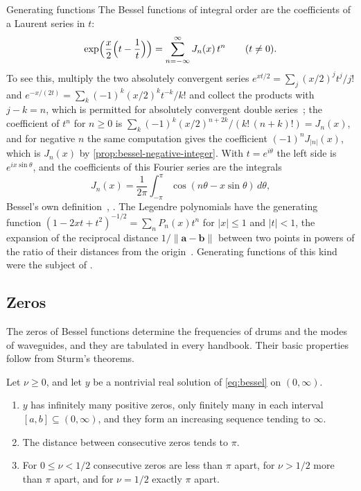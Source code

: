 \begin{note}{Generating functions}
The Bessel functions of integral order are the coefficients of a Laurent series in $t$:
\[
\exp\Bigl(\frac x2\Bigl(t-\frac1t\Bigr)\Bigr)=\sum_{n=-\infty}^\infty J_n(x)\,t^n\qquad(t\ne0).
\]
To see this, multiply the two absolutely convergent series $e^{xt/2}=\sum_j(x/2)^jt^j/j!$ and $e^{-x/(2t)}=\sum_k(-1)^k(x/2)^kt^{-k}/k!$ and collect the products with $j-k=n$, which is permitted for absolutely convergent double series~\cite[Chap.~II]{knopp1990}; the coefficient of $t^n$ for $n\ge0$ is $\sum_k(-1)^k(x/2)^{n+2k}/(k!\,(n+k)!)=J_n(x)$, and for negative $n$ the same computation gives the coefficient $(-1)^nJ_{|n|}(x)$, which is $J_n(x)$ by \cref{prop:bessel-negative-integer}. With $t=e^{i\theta}$ the left side is $e^{ix\sin\theta}$, and the coefficients of this Fourier series are the integrals
\[
J_n(x)=\frac1{2\pi}\int_{-\pi}^\pi\cos(n\theta-x\sin\theta)\,d\theta ,
\]
Bessel's own definition~\cite{bessel1824}, \cite[Chap.~II]{watson1944}. The Legendre polynomials have the generating function $(1-2xt+t^2)^{-1/2}=\sum_nP_n(x)t^n$ for $|x|\le1$ and $|t|<1$, the expansion of the reciprocal distance $1/\|\mathbf a-\mathbf b\|$ between two points in powers of the ratio of their distances from the origin~\cite[Chap.~XV]{whittaker1927}. Generating functions of this kind were the subject of .
\end{note}

\subsection{Zeros}

The zeros of Bessel functions determine the frequencies of drums and the modes of waveguides, and they are tabulated in every handbook. Their basic properties follow from Sturm's theorems.

\begin{theorem}
\label{thm:bessel-zeros}
Let $\nu\ge0$, and let $y$ be a nontrivial real solution of \eqref{eq:bessel} on $(0,\infty)$.
\begin{enumerate}
\item $y$ has infinitely many positive zeros, only finitely many in each interval $[a,b]\subseteq(0,\infty)$, and they form an increasing sequence tending to $\infty$.
\item The distance between consecutive zeros tends to $\pi$.
\item For $0\le\nu<1/2$ consecutive zeros are less than $\pi$ apart, for $\nu>1/2$ more than $\pi$ apart, and for $\nu=1/2$ exactly $\pi$ apart.
\end{enumerate}
\end{theorem}

